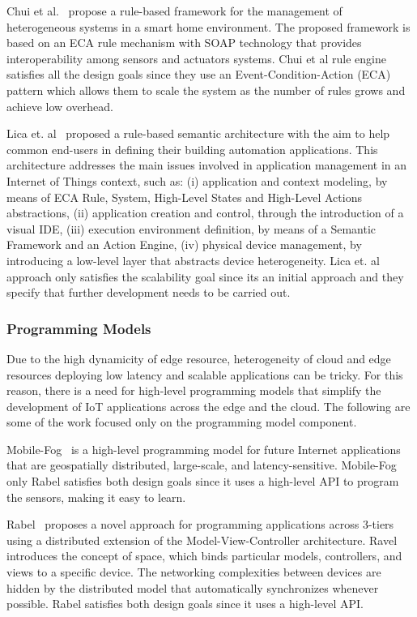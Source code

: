 Chui et al.~\cite{5277977} propose a rule-based framework for the management of heterogeneous systems in a smart home environment. The proposed framework is based on an ECA rule mechanism with SOAP technology that provides interoperability among sensors and actuators systems. Chui et al rule engine satisfies all the design goals since they use an Event-Condition-Action (ECA) pattern which allows them to scale the system as the number of rules grows and achieve low overhead. 

Lica et. al~\cite{7314063} proposed a rule-based semantic architecture with the aim to help common end-users in defining their building automation applications. This architecture addresses the main issues involved in application management in an Internet of Things context, such as: (i) application and context modeling, by means of ECA Rule, System, High-Level States and High-Level Actions abstractions, (ii) application creation and control, through the introduction of a visual IDE, (iii) execution environment definition, by means of a Semantic Framework and an Action Engine, (iv) physical device management, by introducing a low-level layer that abstracts device heterogeneity. Lica et. al approach only satisfies the scalability goal since its an initial approach and they specify that further development needs to be carried out.

\subsubsection{Programming Models}
Due to the high dynamicity of edge resource, heterogeneity of cloud and edge resources deploying low latency and scalable applications can be tricky. For this reason, there is a need for high-level programming models that simplify the development of IoT applications across the edge and the cloud. The following are some of the work focused only on the programming model component.

Mobile-Fog~\cite{Hong:2013} is a high-level programming model for future Internet applications that are geospatially distributed, large-scale, and latency-sensitive. Mobile-Fog only Rabel satisfies both design goals since it uses a high-level API to program the sensors, making it easy to learn.

Rabel~\cite{ravel-riliskis-iotapp15} proposes a novel approach for programming applications across 3-tiers using a distributed extension of the Model-View-Controller architecture. Ravel introduces the concept of space, which binds particular models, controllers, and views to a specific device. The networking complexities between devices are hidden by the distributed model that automatically synchronizes whenever possible. Rabel satisfies both design goals since it uses a high-level API.

